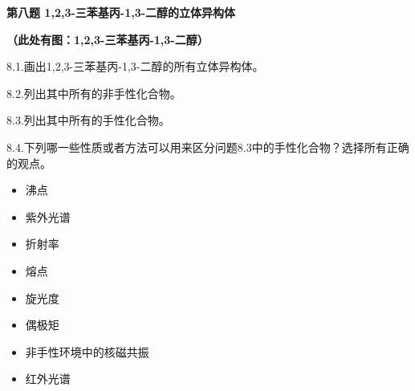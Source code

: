 
\textbf{第八题 1,2,3-三苯基丙-1,3-二醇的立体异构体}

\textbf{（此处有图：1,2,3-三苯基丙-1,3-二醇）}

8.1.画出1,2,3-三苯基丙-1,3-二醇的所有立体异构体。

8.2.列出其中所有的非手性化合物。

8.3.列出其中所有的手性化合物。

8.4.下列哪一些性质或者方法可以用来区分问题8.3中的手性化合物？选择所有正确的观点。

\begin{itemize}
\item
  沸点
\item
  紫外光谱
\item
  折射率
\item
  熔点
\item
  旋光度
\item
  偶极矩
\item
  非手性环境中的核磁共振
\item
  红外光谱
\end{itemize}

\textbf{\\
}
